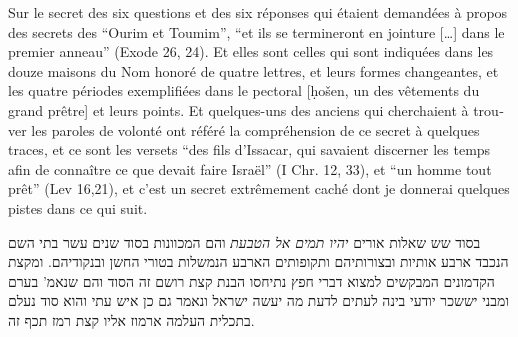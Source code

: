 \documentclass[10pt]{book}
\begin{document}
\begin{alignment}
  \begin{french}

    Sur le secret des six questions et des six réponses qui étaient
    demandées à propos des secrets des \enquote{Ourim et Toumim},
    \enquote{et ils se termineront en jointure […] dans le premier
      anneau} (Exode 26, 24). Et elles sont celles qui sont indiquées
    dans les douze maisons du Nom honoré de quatre lettres, et leurs
    formes changeantes, et les quatre périodes exemplifiées dans le
    pectoral [ḥošen, un des vêtements du grand prêtre] et leurs
    points. Et quelques-uns des anciens qui cherchaient à trouver les
    paroles de volonté ont référé la compréhension de ce secret à
    quelques traces, et ce sont les versets \enquote{des fils
      d’Issacar, qui savaient discerner les temps afin de connaître ce
      que devait faire Israël} (I Chr. 12, 33), et \enquote{un homme
      tout prêt} (Lev 16,21), et c’est un secret extrêmement caché
    dont je donnerai quelques pistes dans ce qui suit.
  \end{french}
  
  \begin{hebrew}

 בסוד שש שאלות    אורים  \emph{ יהיו תמים אל הטבעת
} והם המכוונות בסוד שנים עשר בתי השם הנכבד  ארבע אותיות
ובצורותיהם  ותקופותים הארבע הנמשלות בטורי החשן ובנקודיהם. ומקצת
הקדמונים המבקשים למצוא דברי חפץ נתיחסו הבנת קצת רושם זה הסוד והם שנאמ'
בערם ומבני יששכר יודעי בינה לעתים לדעת מה יעשה ישראל ונאמר גם כן איש
עתי והוא סוד נעלם בתכלית העלמה ארמוז אליו קצת רמז תכף זה.

\end{hebrew}
\end{alignment}
\end{document}

